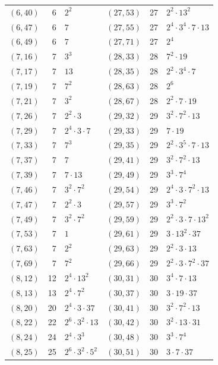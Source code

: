 \documentclass[11pt]{article}
\begin{document}
\begin{longtable}{@{}lrl@{\qquad}lrl@{}}
$(6,40)$ & 6 & $2^{2}$ & $(27,53)$ & 27 & $2^{2}\cdot 13^{2}$\\
$(6,47)$ & 6 & $7$ & $(27,55)$ & 27 & $2^{4}\cdot 3^{4}\cdot 7\cdot 13$\\
$(6,49)$ & 6 & $7$ & $(27,71)$ & 27 & $2^{4}$\\
$(7,16)$ & 7 & $3^{3}$ & $(28,33)$ & 28 & $7^{2}\cdot 19$\\
$(7,17)$ & 7 & $13$ & $(28,35)$ & 28 & $2^{2}\cdot 3^{4}\cdot 7$\\
$(7,19)$ & 7 & $7^{2}$ & $(28,63)$ & 28 & $2^{6}$\\
$(7,21)$ & 7 & $3^{2}$ & $(28,67)$ & 28 & $2^{2}\cdot 7\cdot 19$\\
$(7,26)$ & 7 & $2^{2}\cdot 3$ & $(29,32)$ & 29 & $3^{2}\cdot 7^{2}\cdot 13$\\
$(7,29)$ & 7 & $2^{4}\cdot 3\cdot 7$ & $(29,33)$ & 29 & $7\cdot 19$\\
$(7,33)$ & 7 & $7^{3}$ & $(29,35)$ & 29 & $2^{2}\cdot 3^{5}\cdot 7\cdot 13$\\
$(7,37)$ & 7 & $7$ & $(29,41)$ & 29 & $3^{2}\cdot 7^{2}\cdot 13$\\
$(7,39)$ & 7 & $7\cdot 13$ & $(29,49)$ & 29 & $3^{3}\cdot 7^{4}$\\
$(7,46)$ & 7 & $3^{2}\cdot 7^{2}$ & $(29,54)$ & 29 & $2^{4}\cdot 3\cdot 7^{2}\cdot 13$\\
$(7,47)$ & 7 & $2^{2}\cdot 3$ & $(29,57)$ & 29 & $3^{3}\cdot 7^{2}$\\
$(7,49)$ & 7 & $3^{2}\cdot 7^{2}$ & $(29,59)$ & 29 & $2^{2}\cdot 3\cdot 7\cdot 13^{2}$\\
$(7,53)$ & 7 & $1$ & $(29,61)$ & 29 & $3\cdot 13^{2}\cdot 37$\\
$(7,63)$ & 7 & $2^{2}$ & $(29,63)$ & 29 & $2^{2}\cdot 3\cdot 13$\\
$(7,69)$ & 7 & $7^{2}$ & $(29,66)$ & 29 & $2^{2}\cdot 3\cdot 7^{2}\cdot 37$\\
$(8,12)$ & 12 & $2^{4}\cdot 13^{2}$ & $(30,31)$ & 30 & $3^{4}\cdot 7\cdot 13$\\
$(8,13)$ & 13 & $2^{4}\cdot 7^{2}$ & $(30,37)$ & 30 & $3\cdot 19\cdot 37$\\
$(8,20)$ & 20 & $2^{4}\cdot 3\cdot 37$ & $(30,41)$ & 30 & $3^{2}\cdot 7^{2}\cdot 13$\\
$(8,22)$ & 22 & $2^{6}\cdot 3^{2}\cdot 13$ & $(30,42)$ & 30 & $3^{2}\cdot 13\cdot 31$\\
$(8,24)$ & 24 & $2^{4}\cdot 3^{3}$ & $(30,48)$ & 30 & $3^{3}\cdot 7^{4}$\\
$(8,25)$ & 25 & $2^{6}\cdot 3^{2}\cdot 5^{2}$ & $(30,51)$ & 30 & $3\cdot 7\cdot 37$\\

\end{longtable}
\end{document}
